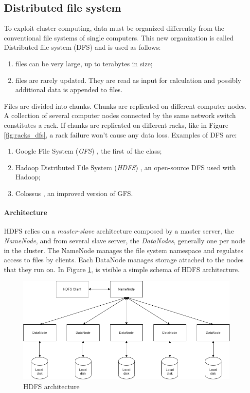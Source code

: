\documentclass[\main/main.tex]{subfiles}
\begin{document}
\subsection{Distributed file system}
To exploit cluster computing, data must be organized differently from the conventional file systems of single computers. This new organization is called Distributed file system (DFS) and is used as follows:
\begin{enumerate}
    \item files can be very large, up to terabytes in size;
    \item files are rarely updated. They are read as input for calculation and possibly additional data is appended to files.
\end{enumerate}
Files are divided into chunks. Chunks are replicated on different computer nodes. A collection of several computer nodes connected by the same network switch constitutes a rack. If chunks are replicated on different racks, like in Figure \ref{fig:racks_dfs}, a rack failure won't cause any data loss.
Examples of DFS are:
\begin{enumerate}
    \item Google File System (\emph{GFS}) \cite{GhemawatSanjay2003TheGF}, the first of the class;
    \item Hadoop Distributed File System (\emph{HDFS}) \cite{Shvachko2010TheHD}, an open-source DFS used with Hadoop;
    \item Colossus \cite{10.1145/2491245}, an improved version of GFS.
\end{enumerate}
\paragraph{Architecture} HDFS relies on a \emph{master-slave} architecture composed by a master server, the \emph{NameNode}, and from several slave server, the \emph{DataNodes}, generally one per node in the cluster. The NameNode manages the file system namespace and regulates access to files by clients. Each DataNode manages storage attached to the nodes that they run on. In Figure \ref{fig:hdfs_architecture}, is visible a simple schema of HDFS architecture.
\begin{figure}[H]
    \centering
    \includegraphics[scale=0.35]{images/cluster_computing/hdfs_architecture.png}
    \caption{HDFS  architecture}
    \label{fig:hdfs_architecture}
\end{figure}
\end{document}
